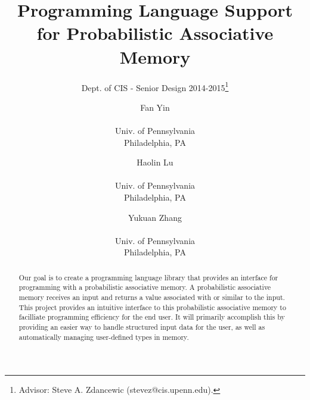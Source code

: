 \documentclass{sig-alternate}
\begin{document}
 

\title{Programming Language Support for Probabilistic Associative Memory}
\subtitle{Dept. of CIS - Senior Design 2014-2015\thanks{Advisor: Steve A. Zdancewic (stevez@cis.upenn.edu).}}
\author{
    Fan Yin \\  \\Univ. of Pennsylvania \\ Philadelphia, PA
    \and Haolin Lu \\  \\Univ. of Pennsylvania \\ Philadelphia, PA
    \and Yukuan Zhang\\  \\Univ. of Pennsylvania \\ Philadelphia, PA
}
%
%
\date{}
\maketitle


\begin{abstract}
    Our goal is to create a programming language library that provides an interface
    for programming with a probabilistic associative memory.
    A probabilistic associative memory receives an input and returns a value associated with
    or similar to the input. This project provides an intuitive interface to this probabilistic
    associative memory to facilliate programming efficiency for the end user. It will primarily
    accomplish this by providing an easier way to handle structured input data for the user, as well
    as automatically managing user-defined types in memory.
\end{abstract}
\end{document}
